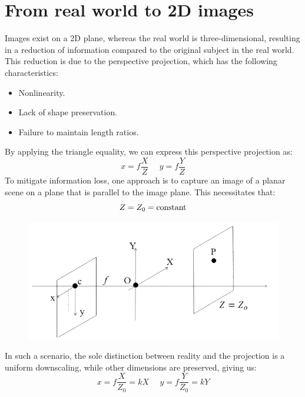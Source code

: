 \documentclass[12pt, a4paper]{report}
\begin{document}
    \section{From real world to 2D images}
    Images exist on a 2D plane, whereas the real world is three-dimensional, resulting in a reduction of information compared to the original subject in the real world. 
    This reduction is due to the perspective projection, which has the following characteristics:
    \begin{itemize}
        \item Nonlinearity.
        \item Lack of shape preservation.
        \item Failure to maintain length ratios.
    \end{itemize}
    By applying the triangle equality, we can express this perspective projection as:
    \[x=f \dfrac{X}{Z} \:\:\:\:\:\: y=f \dfrac{Y}{Z}\]
    To mitigate information loss, one approach is to capture an image of a planar scene on a plane that is parallel to the image plane. 
    This necessitates that:
    \[Z=Z_0=\textnormal{constant}\]
    \begin{figure}[H]
        \centering
        \includegraphics[width=0.5\linewidth]{images/Z0.png}
    \end{figure}
    In such a scenario, the sole distinction between reality and the projection is a uniform downscaling, while other dimensions are preserved, giving us:
    \[x=f \dfrac{X}{Z_0}=kX \:\:\:\:\:\: y=f \dfrac{Y}{Z_0}=kY \]
    
\end{document}
